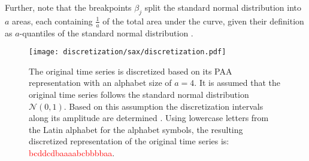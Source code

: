 Further, note that the breakpoints $\beta_j$ split the standard normal distribution into $a$ areas, each containing $\frac{1}{a}$ of the total area under the curve, given their definition as $a$-quantiles of the standard normal distribution \cite{SAX_Lin_first}.
\begin{figure}[htb]
\centering
\texttt{[image: discretization/sax/discretization.pdf]}
\caption[Symbolic Aggregate Approximation - Discretization]{The original time series is discretized based on its PAA representation with an alphabet size of $a = 4$. It is assumed that the original time series follows the standard normal distribution $\mathcal{N}(0,1)$. Based on this assumption the discretization intervals along its amplitude are determined \cite{SAX_Lin_first}. Using lowercase letters from the Latin alphabet for the alphabet symbols, the resulting discretized representation of the original time series is: \textcolor{red}{bcddcdbaaaabcbbbbaa}.}
\label{fig:SAX_discretization}
\end{figure}
